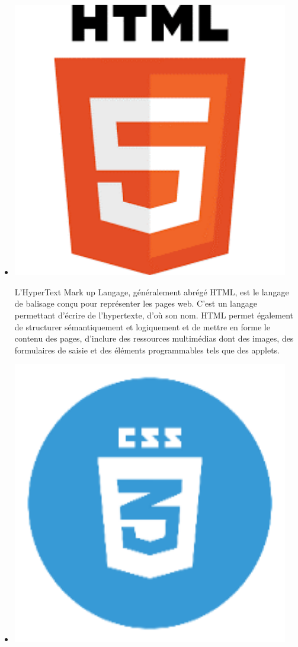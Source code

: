 	\begin{itemize}
		\item  \begin{minipage}{.10\textwidth}%
			\includegraphics[width=0.95\textwidth]{D) IMAGES/html.png}
		\end{minipage}%
		L’HyperText Mark up Langage, généralement abrégé HTML, est le langage de balisage conçu pour représenter les pages web.
C’est un langage permettant d’écrire de l’hypertexte, d’où son nom. HTML permet également de structurer sémantiquement et logiquement et de mettre en forme le contenu des pages, d’inclure des ressources multimédias dont des images, des formulaires de saisie et des éléments 
programmables tels que des applets. 
	\item \begin{minipage}{.10\textwidth}%
		\includegraphics[width=0.95\textwidth]{D) IMAGES/css.png}

\end{minipage}
\end{itemize}
